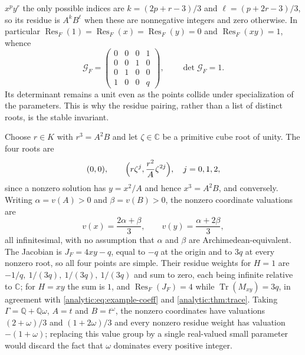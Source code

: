 \documentclass[11pt,letterpaper]{article}
\theoremstyle{definition}
\theoremstyle{remark}
\newcommand{\C}{\mathbb C}
\newcommand{\Q}{\mathbb Q}
\newcommand{\Res}{\operatorname{Res}}
\newcommand{\Tr}{\operatorname{Tr}}
\numberwithin{equation}{section}
\begin{document}
$x^py^r$ the only possible indices are $k=(2p+r-3)/3$ and
$\ell=(p+2r-3)/3$, so its residue is $A^kB^\ell$ when these are nonnegative
integers and zero otherwise. In particular
$\Res_F(1)=\Res_F(x)=\Res_F(y)=0$ and $\Res_F(xy)=1$, whence
\begin{equation}\label{analytic:eq:example-gram}
 \mathcal G_F=\begin{pmatrix}
 0&0&0&1\\0&0&1&0\\0&1&0&0\\1&0&0&q\end{pmatrix},
 \qquad\det\mathcal G_F=1 .
\end{equation}
Its determinant remains a unit even as the points collide under
specialization of the parameters. This is why the residue pairing, rather
than a list of distinct roots, is the stable invariant.

Choose $r\in K$ with $r^3=A^2B$ and let $\zeta\in\C$ be a primitive cube
root of unity. The four roots are
\begin{equation}\label{analytic:eq:four-roots}
 (0,0),\qquad\Bigl(r\zeta^j,\frac{r^2}{A}\zeta^{2j}\Bigr),\quad j=0,1,2 ,
\end{equation}
since a nonzero solution has $y=x^2/A$ and hence $x^3=A^2B$, and conversely.
Writing $\alpha=v(A)>0$ and $\beta=v(B)>0$, the nonzero coordinate
valuations are
\begin{equation}\label{analytic:eq:four-valuations}
 v(x)=\frac{2\alpha+\beta}{3},\qquad v(y)=\frac{\alpha+2\beta}{3},
\end{equation}
all infinitesimal, with no assumption that $\alpha$ and $\beta$ are
Archimedean-equivalent. The Jacobian is $J_F=4xy-q$, equal to $-q$ at the
origin and to $3q$ at every nonzero root, so all four points are simple.
Their residue weights for $H=1$ are $-1/q,\ 1/(3q),\ 1/(3q),\ 1/(3q)$ and
sum to zero, each being infinite relative to $\C$; for $H=xy$ the sum is
$1$, and $\Res_F(J_F)=4$ while $\Tr(M_{xy})=3q$, in agreement with
\eqref{analytic:eq:example-coeff} and
\cref{analytic:thm:trace}. Taking $\Gamma=\Q+\Q\omega$, $A=t$ and
$B=t^\omega$, the nonzero coordinates have valuations $(2+\omega)/3$ and
$(1+2\omega)/3$ and every nonzero residue weight has valuation
$-(1+\omega)$; replacing this value group by a single real-valued small
parameter would discard the fact that $\omega$ dominates every positive
integer.
\end{document}
